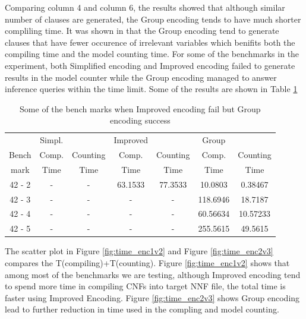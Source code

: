 \noindent Comparing column 4 and column 6, the results showed that although similar number of clauses are generated, the Group encoding tends to have much shorter compliling time. It was shown in \cite{2006-enc3} that the Group encoding tend to generate clauses that have fewer occurence of irrelevant variables which benifits both the compiling time and the model counting time. For some of the benchmarks in the experiment, both Simplified encoding and Improved encoding failed to generate results in the model counter while the Group encoding managed to answer inference queries within the time limit. Some of the results are shown in Table \ref{tab:good Group encoding}\\
\begin{table}[]
\centering
\begin{tabular}{c|c c | c c | c c}
    \hline
    	&	Simpl.	&		&	Improved	&		&	Group	&		\\
    
	Bench		&	Comp. 	&	Counting 	&	Comp. 	&	Counting 	&	Comp. 	&	Counting 	\\
mark	&	Time	&	Time	&	Time	&	Time	&	Time	&	Time	\\
	\hline
	\hline
    42	-	2	&	-	&	-	& 63.1533 &	77.3533	&	10.0803	&	0.38467	\\
    42	-	3	&	-	&	-	&	-	&	-	&	118.6946	&	18.7187	\\
    42	-	4	&	-	&	-	&	-	&	-	&	60.56634	&	10.57233	\\
    42	-	5	&	-	&	-	&	-	&	-	&	255.5615	&	49.5615	\\
    \hline
\end{tabular}
\caption{Some of the bench marks when Improved encoding fail but Group encoding success}
    \label{tab:good Group encoding}
\end{table}

\noindent The scatter plot in Figure \ref{fig:time_enc1v2} and Figure \ref{fig:time_enc2v3} compares the T(compiling)+T(counting). Figure \ref{fig:time_enc1v2} shows that among most of the benchmarks we are testing, although Improved encoding tend to spend more time in compiling CNFs into target NNF file, the total time is faster using Improved Encoding. Figure \ref{fig:time_enc2v3} shows Group encoding lead to further reduction in time used in the compling and model counting.\\

